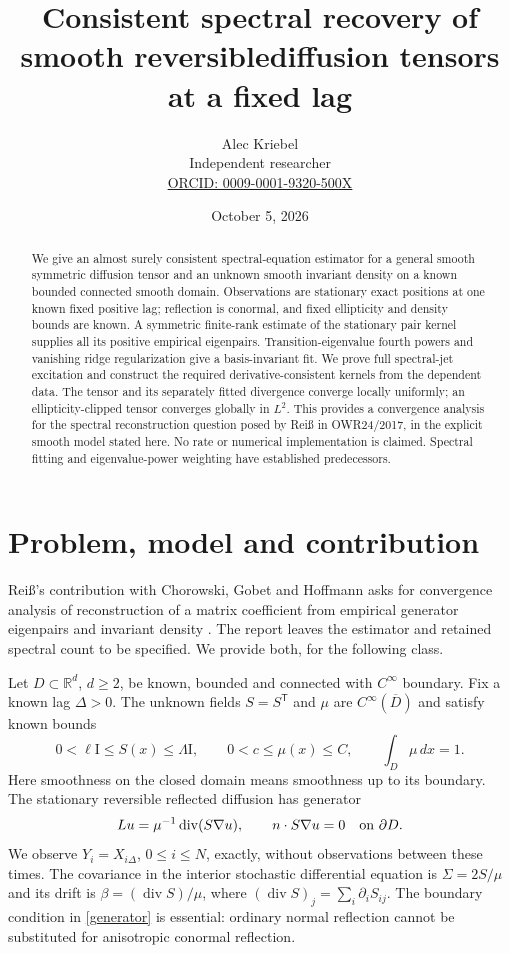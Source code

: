 \documentclass[11pt]{article}
\title{Consistent spectral recovery of smooth reversible\newline diffusion tensors at a fixed lag}
\author{Alec Kriebel\\Independent researcher\\
\small\href{https://orcid.org/0009-0001-9320-500X}{ORCID: 0009-0001-9320-500X}}
\date{October 5, 2026}
\theoremstyle{remark}\newtheorem{remark}[theorem]{Remark}
\newcommand{\R}{\mathbb R}
\newcommand{\dd}{\,dx}
\newcommand{\Div}{\operatorname{div}}
\newcommand{\Id}{\mathrm I}
\newcommand{\tr}{\mathsf T}
\begin{document}
\maketitle
\begin{abstract}
We give an almost surely consistent spectral-equation estimator for a general
smooth symmetric diffusion tensor and an unknown smooth invariant density on
a known bounded connected smooth domain. Observations are stationary exact
positions at one known fixed positive lag; reflection is conormal, and fixed
ellipticity and density bounds are known. A symmetric finite-rank estimate of
the stationary pair kernel supplies all its positive empirical eigenpairs.
Transition-eigenvalue fourth powers and vanishing ridge regularization give a
basis-invariant fit. We prove full spectral-jet excitation and construct the
required derivative-consistent kernels from the dependent data. The tensor
and its separately fitted divergence converge locally uniformly; an
ellipticity-clipped tensor converges globally in $L^2$. This provides a
convergence analysis for the spectral reconstruction question posed by Rei\ss{}
in OWR24/2017, in the explicit smooth model stated here. No rate or numerical
implementation is claimed. Spectral fitting and eigenvalue-power weighting
have established predecessors.
\end{abstract}

\section{Problem, model and contribution}
Rei\ss{}'s contribution with Chorowski, Gobet and Hoffmann asks for convergence
analysis of reconstruction of a matrix coefficient from empirical generator
eigenpairs and invariant density \cite[pp.~1507--1509]{reiss}. The report
leaves the estimator and retained spectral count to be specified. We provide
both, for the following class.

Let $D\subset\R^d$, $d\geq2$, be known, bounded and connected with
$C^\infty$ boundary. Fix a known lag $\Delta>0$. The unknown fields
$S=S^\tr$ and $\mu$ are $C^\infty(\overline D)$ and satisfy known bounds
\begin{equation}\label{bounds}
 0<\ell\Id\leq S(x)\leq\Lambda\Id,\qquad
 0<c\leq\mu(x)\leq C,\qquad \int_D\mu\dd=1.
\end{equation}
Here smoothness on the closed domain means smoothness up to its boundary.
The stationary reversible reflected diffusion has generator
\begin{equation}\label{generator}
 Lu=\mu^{-1}\Div(S\nabla u),\qquad n\cdot S\nabla u=0
 \quad\hbox{on }\partial D.
\end{equation}
We observe $Y_i=X_{i\Delta}$, $0\leq i\leq N$, exactly, without observations
between these times. The covariance in the interior stochastic differential
equation is $\Sigma=2S/\mu$ and its drift is
$\beta=(\Div S)/\mu$, where $(\Div S)_j=\sum_i\partial_iS_{ij}$.
The boundary condition in \eqref{generator} is essential: ordinary normal
reflection cannot be substituted for anisotropic conormal reflection.
\end{document}
